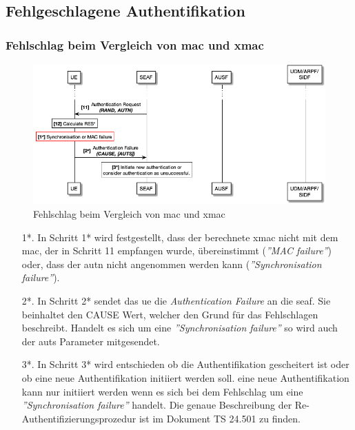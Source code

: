 \subsection{Fehlgeschlagene Authentifikation}

\subsubsection{Fehlschlag beim Vergleich von \gls{mac} und \gls{xmac}}

\begin{figure}[H]
  \centering
  \includegraphics[width=\textwidth]{uml/protocol_mac_failure_v1.png}
  \caption{Fehlschlag beim Vergleich von \gls{mac} und \gls{xmac}}
  \label{fig:protocol_mac_failure_v1}
\end{figure}

\begin{enumerate}
\item[1*.] In Schritt 1* wird festgestellt, dass der berechnete \gls{xmac} nicht mit dem \gls{mac}, der in Schritt 11 empfangen wurde, \"ubereinstimmt (\textit{''MAC failure''}) oder, dass der \gls{autn} nicht angenommen werden kann (\textit{''Synchronisation failure''}).

\item[2*.] In Schritt 2* sendet das \gls{ue} die \textit{Authentication Failure} an die \gls{seaf}.
Sie beinhaltet den CAUSE Wert, welcher den Grund f\"ur das Fehlschlagen beschreibt.
Handelt es sich um eine \textit{''Synchronisation failure''} so wird auch der \gls{auts} Parameter mitgesendet.

\item[3*.] In Schritt 3* wird entschieden ob die Authentifikation gescheitert ist oder ob eine neue Authentifikation initiiert werden soll.
eine neue Authentifikation kann nur initiiert werden wenn es sich bei dem Fehlschlag um eine \textit{''Synchronisation failure''} handelt.
Die genaue Beschreibung der Re-Authentifizierungsprozedur ist im Dokument TS 24.501 zu finden. %
\end{enumerate}



